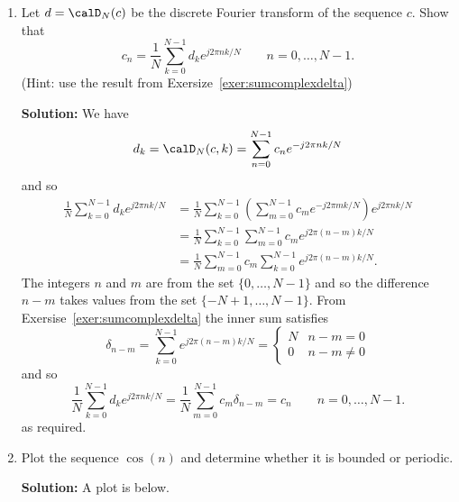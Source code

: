 \documentclass[11pt,a4paper]{book}
\theoremstyle{plain}
\numberwithin{equation}{section}
\newenvironment{solution}{\begin{footnotesize}\textbf{Solution:}}{\end{footnotesize}}
\newenvironment{excersizelist}{%
  \renewcommand*{\theenumi}{\thechapter.\arabic{enumi}}%
  \newcommand\itemadvanced{\stepcounter{enumi}\item[$\ast$\, \theenumi.]}
  \begin{enumerate}
}{%
  \end{enumerate}
}
\begin{document}
\begin{excersizelist}
\item \label{exer:inversedft} Let $d = \calD_N(c)$ be the discrete Fourier transform of the sequence $c$.  Show that
\[
c_n = \frac{1}{N}\sum_{k = 0}^{N-1} d_k e^{j 2\pi n k / N} \qquad n = 0, \dots, N-1.
\]
(Hint: use the result from Exersize~\ref{exer:sumcomplexdelta})
\begin{solution}
We have
\[
d_k = \calD_N(c,k) = \sum_{n = 0}^{N-1} c_n e^{-j 2\pi n k / N}
\]
and so
\begin{align*}
\frac{1}{N}\sum_{k = 0}^{N-1} d_k e^{j 2\pi n k / N} &= \frac{1}{N}\sum_{k = 0}^{N-1} \left( \sum_{m = 0}^{N-1} c_m e^{-j 2\pi m k / N} \right) e^{j 2\pi n k / N} \\
&= \frac{1}{N}\sum_{k = 0}^{N-1} \sum_{m = 0}^{N-1} c_m e^{j 2\pi (n-m) k / N} \\
&=  \frac{1}{N} \sum_{m = 0}^{N-1} c_m \sum_{k = 0}^{N-1} e^{j 2\pi (n-m) k / N}.
\end{align*}
The integers $n$ and $m$ are from the set $\{0,\dots,N-1\}$ and so the difference $n-m$ takes values from the set $\{-N+1,\dots,N-1\}$.  From Exersise~\ref{exer:sumcomplexdelta} the inner sum satisfies
\[
\delta_{n-m} = \sum_{k = 0}^{N-1} e^{j 2\pi (n-m) k / N} = \begin{cases}
N & n - m = 0 \\
0 & n-m \neq 0
\end{cases}
\]
and so
\[
\frac{1}{N}\sum_{k = 0}^{N-1} d_k e^{j 2\pi n k / N} = \frac{1}{N} \sum_{m = 0}^{N-1} c_m \delta_{n-m} = c_n \qquad n = 0, \dots, N-1.
\]
as required.

\end{solution}

\item Plot the sequence $\cos(n)$ and determine whether it is bounded or periodic.
\begin{solution}
A plot is below.  

\begin{center}
{
\def\minn{-15}
\def\maxn{15}
\def\scalex{0.3}
\def\step(#1){(#1>=0)} %
}
\end{center}


\end{solution}
\end{excersizelist}
\end{document}
